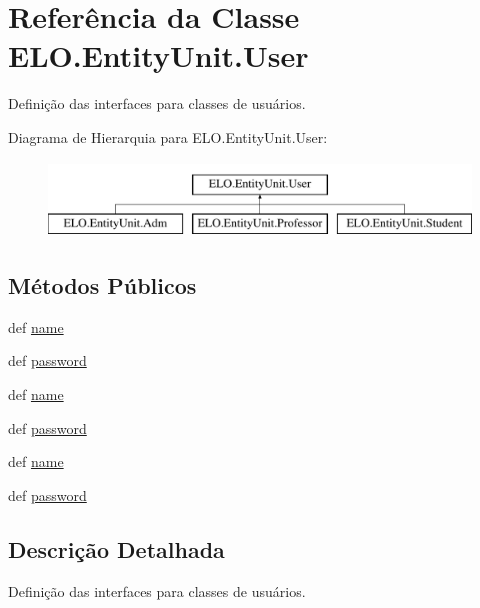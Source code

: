 \hypertarget{classELO_1_1EntityUnit_1_1User}{\section{Referência da Classe E\-L\-O.\-Entity\-Unit.\-User}
\label{dd/d09/classELO_1_1EntityUnit_1_1User}
}


Definição das interfaces para classes de usuários.  


Diagrama de Hierarquia para E\-L\-O.\-Entity\-Unit.\-User\-:\begin{figure}[H]
\begin{center}
\leavevmode
\includegraphics[height=2.000000cm]{dd/d09/classELO_1_1EntityUnit_1_1User}
\end{center}
\end{figure}
\subsection*{Métodos Públicos}
\begin{DoxyCompactItemize}
\item 
def \hyperlink{classELO_1_1EntityUnit_1_1User_ad8e94293952f8018f67b59327900c429}{name}
\item 
def \hyperlink{classELO_1_1EntityUnit_1_1User_a01ae16d257db991dd048c84dba5034c0}{password}
\item 
def \hyperlink{classELO_1_1EntityUnit_1_1User_ad8e94293952f8018f67b59327900c429}{name}
\item 
def \hyperlink{classELO_1_1EntityUnit_1_1User_a01ae16d257db991dd048c84dba5034c0}{password}
\item 
def \hyperlink{classELO_1_1EntityUnit_1_1User_ad8e94293952f8018f67b59327900c429}{name}
\item 
def \hyperlink{classELO_1_1EntityUnit_1_1User_a01ae16d257db991dd048c84dba5034c0}{password}
\end{DoxyCompactItemize}


\subsection{Descrição Detalhada}
Definição das interfaces para classes de usuários. 

